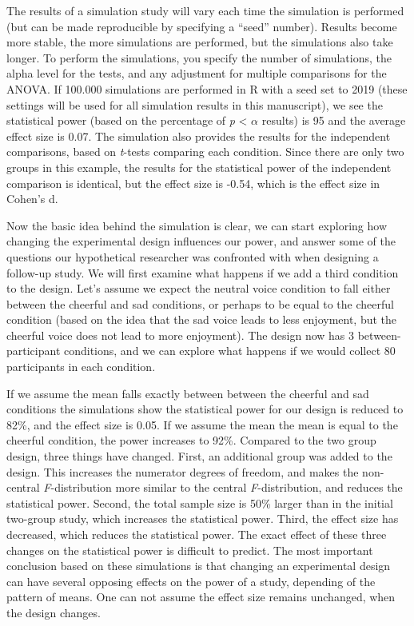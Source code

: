 \documentclass[,jou, draftfirst, a4paper,floatsintext]{apa6}
\begin{document}
The results of a simulation study will vary each time the simulation is performed (but can be made reproducible by specifying a \enquote{seed} number).
Results become more stable, the more simulations are performed, but the simulations also take longer.
To perform the simulations, you specify the number of simulations, the alpha level for the tests, and any adjustment for multiple comparisons for the ANOVA.
If 100.000 simulations are performed in R with a seed set to 2019 (these settings will be used for all simulation results in this manuscript), we see the statistical power (based on the percentage of \emph{p} \textless{} \(\alpha\) results) is 95 and the average effect size is 0.07.
The simulation also provides the results for the independent comparisons, based on \emph{t}-tests comparing each condition.
Since there are only two groups in this example, the results for the statistical power of the independent comparison is identical, but the effect size is -0.54, which is the effect size in Cohen's d.~

Now the basic idea behind the simulation is clear, we can start exploring how changing the experimental design influences our power, and answer some of the questions our hypothetical researcher was confronted with when designing a follow-up study.
We will first examine what happens if we add a third condition to the design.
Let's assume we expect the neutral voice condition to fall either between the cheerful and sad conditions, or perhaps to be equal to the cheerful condition (based on the idea that the sad voice leads to less enjoyment, but the cheerful voice does not lead to more enjoyment).
The design now has 3 between-participant conditions, and we can explore what happens if we would collect 80 participants in each condition.

If we assume the mean falls exactly between between the cheerful and sad conditions the simulations show the statistical power for our design is reduced to 82\%, and the effect size is 0.05.
If we assume the mean the mean is equal to the cheerful condition, the power increases to 92\%.
Compared to the two group design, three things have changed.
First, an additional group was added to the design.
This increases the numerator degrees of freedom, and makes the non-central \emph{F}-distribution more similar to the central \emph{F}-distribution, and reduces the statistical power.
Second, the total sample size is 50\% larger than in the initial two-group study, which increases the statistical power.
Third, the effect size has decreased, which reduces the statistical power.
The exact effect of these three changes on the statistical power is difficult to predict.
The most important conclusion based on these simulations is that changing an experimental design can have several opposing effects on the power of a study, depending of the pattern of means.
One can not assume the effect size remains unchanged, when the design changes.
\end{document}
